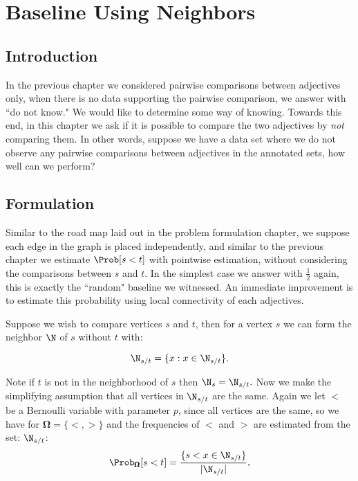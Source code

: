 \section{Baseline Using Neighbors}

\subsection{Introduction}

In the previous chapter we considered pairwise comparisons between adjectives only, when there is no data supporting the pairwise comparison, we answer with ``do not know."  We would like to determine some way of knowing. Towards this end, in this chapter we ask if it is possible to compare the two adjectives by \textit{not} comparing them. In other words, suppose we have a data set where we do not observe any pairwise comparisons between adjectives in the annotated sets, how well can we perform?

\subsection{Formulation}

Similar to the road map laid out in the problem formulation chapter, we suppose each edge in the graph is placed independently, and similar to the previous chapter we estimate $\Prob[ s < t ]$ with pointwise estimation, without considering the comparisons between $s$ and $t$. In the simplest case we answer with $\frac{1}{2}$ again, this is exactly the ``random" baseline we witnessed. An immediate improvement is to estimate this probability using local connectivity of each adjectives. 

Suppose we wish to compare vertices $s$ and $t$, then for a vertex $s$ we can form the neighbor $\N$ of $s$ without $t$ with:

	\[
		\N_{s/t} = \{ x : x \in \N_{s/t}\}.
	\]

Note if $t$ is not in the neighborhood of $s$ then $\N_s = \N_{s/t}.$ Now we make the simplifying assumption that all vertices in $\N_{s/t}$ are the same. Again we let $<$ be a Bernoulli variable with parameter $p$, since all vertices are the same, so we have for $\pmb{\Omega} = \{<,>\}$ and the frequencies of $<$ and $>$ are estimated from the set: $\N_{s/t}$:
	\[
		\Prob_{\pmb{\Omega}}[s < t] = \frac{\{ s < x \in \N_{s/t}\}}{|\N_{s/t}|},
	\]

